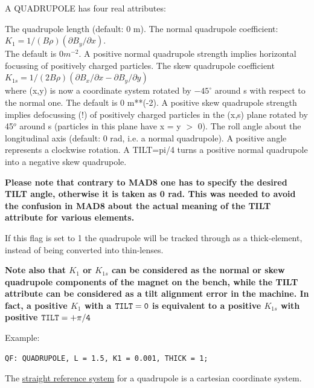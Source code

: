 A QUADRUPOLE has four real attributes:     
\begin{madlist}
    The quadrupole length (default: 0 m). 
    The normal quadrupole coefficient:        
     $K_1 = 1/(B \rho) (\partial B_y / \partial x)$.\\ 
     The default is $0 m^{-2}$. A positive normal quadrupole strength
     implies horizontal focussing of positively charged particles.  
    The skew quadrupole coefficient 
     $K_{1s} = 1/(2 B \rho) (\partial B_x / \partial x - \partial B_y / \partial y)$\\  
     where (x,y) is now a coordinate system rotated by $-45^\circ$ around s
     with respect to the normal one. The default is 0  m**(-2). A
     positive skew quadrupole strength implies defocussing (!) of
     positively charged particles in the (x,s) plane rotated by 45$^o$
     around s (particles in this plane have x = y $>$ 0). 
    The roll angle about the longitudinal axis (default: 0
     rad, i.e. a normal quadrupole). A positive angle represents a
     clockwise rotation. A TILT=pi/4 turns a positive normal quadrupole
     into a negative skew quadrupole.          

\textbf{ Please note that contrary to MAD8 one has to
  specify the desired TILT angle, otherwise it is taken as
  0 rad. This was needed to avoid the confusion in MAD8
  about the actual meaning of the TILT attribute for
  various elements. } 

     If this flag is set to 1 the quadrupole will be tracked
      through as a thick-element, instead of being converted into
      thin-lenses.  
\end{madlist}

\textbf{ Note also that $K_1$ or $K_{1s}$ can be considered as
  the normal or skew quadrupole components of the magnet on
  the bench, while the TILT attribute can be considered as a
  tilt alignment error in the machine. In fact, a positive
  $K_1$ with a $\tt{TILT} = 0$ is equivalent to a positive $K_{1s}$
  with positive $\tt{TILT} = +\pi/4$ } 

Example: 
\begin{verbatim}
QF: QUADRUPOLE, L = 1.5, K1 = 0.001, THICK = 1;
\end{verbatim}     

The \href{local_system.html#straight}{straight reference system} for
a quadrupole is a cartesian coordinate system.



